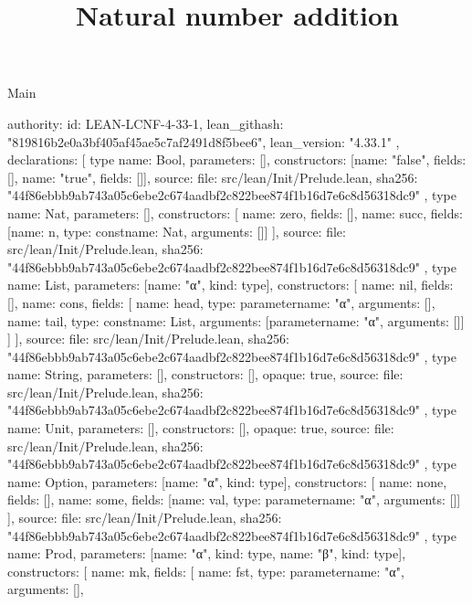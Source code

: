 \begin{lexlean}{Main}
\title{Natural number addition}
\begin{toolingmodule}
{
  authority: {
    id: LEAN-LCNF-4-33-1,
    lean_githash: "819816b2e0a3bf405af45ae5c7af2491d8f5bee6",
    lean_version: "4.33.1"
  },
  declarations: [
    type{
      name: Bool,
      parameters: [],
      constructors: [{name: "false", fields: []}, {name: "true", fields: []}],
      source: {
        file: src/lean/Init/Prelude.lean,
        sha256: "44f86ebbb9ab743a05c6ebe2c674aadbf2c822bee874f1b16d7e6c8d56318dc9"
      }
    },
    type{
      name: Nat,
      parameters: [],
      constructors: [
        {name: zero, fields: []},
        {name: succ, fields: [{name: n, type: const{name: Nat, arguments: []}}]}
      ],
      source: {
        file: src/lean/Init/Prelude.lean,
        sha256: "44f86ebbb9ab743a05c6ebe2c674aadbf2c822bee874f1b16d7e6c8d56318dc9"
      }
    },
    type{
      name: List,
      parameters: [{name: "α", kind: type{}}],
      constructors: [
        {name: nil, fields: []},
        {
          name: cons,
          fields: [
            {name: head, type: parameter{name: "α", arguments: []}},
            {name: tail, type: const{name: List, arguments: [parameter{name: "α", arguments: []}]}}
          ]
        }
      ],
      source: {
        file: src/lean/Init/Prelude.lean,
        sha256: "44f86ebbb9ab743a05c6ebe2c674aadbf2c822bee874f1b16d7e6c8d56318dc9"
      }
    },
    type{
      name: String,
      parameters: [],
      constructors: [],
      opaque: true,
      source: {
        file: src/lean/Init/Prelude.lean,
        sha256: "44f86ebbb9ab743a05c6ebe2c674aadbf2c822bee874f1b16d7e6c8d56318dc9"
      }
    },
    type{
      name: Unit,
      parameters: [],
      constructors: [],
      opaque: true,
      source: {
        file: src/lean/Init/Prelude.lean,
        sha256: "44f86ebbb9ab743a05c6ebe2c674aadbf2c822bee874f1b16d7e6c8d56318dc9"
      }
    },
    type{
      name: Option,
      parameters: [{name: "α", kind: type{}}],
      constructors: [
        {name: none, fields: []},
        {name: some, fields: [{name: val, type: parameter{name: "α", arguments: []}}]}
      ],
      source: {
        file: src/lean/Init/Prelude.lean,
        sha256: "44f86ebbb9ab743a05c6ebe2c674aadbf2c822bee874f1b16d7e6c8d56318dc9"
      }
    },
    type{
      name: Prod,
      parameters: [{name: "α", kind: type{}}, {name: "β", kind: type{}}],
      constructors: [
        {
          name: mk,
          fields: [
            {name: fst, type: parameter{name: "α", arguments: []}},
}}}
\end{toolingmodule}
\end{lexlean}
